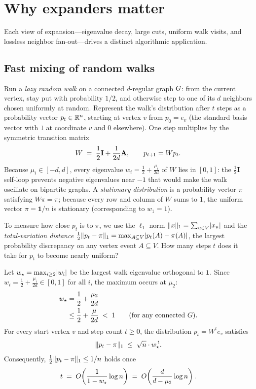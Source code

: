 \section{Why expanders matter}
\label{ch34:applications}

Each view of expansion---eigenvalue decay, large cuts, uniform walk visits, and lossless neighbor fan-out---drives a distinct algorithmic application.

\subsection{Fast mixing of random walks}
\label{ch34:mixing}

Run a \emph{lazy random walk} on a connected $d$-regular graph $G$: from the current vertex, stay put with probability $1/2$, and otherwise step to one of its $d$ neighbors chosen uniformly at random. Represent the walk's distribution after $t$ steps as a probability vector $p_t\in\mathbb{R}^n$, starting at vertex $v$ from $p_0=e_v$ (the standard basis vector with $1$ at coordinate $v$ and $0$ elsewhere). One step multiplies by the symmetric transition matrix
\[
  W \;=\; \frac{1}{2}\mathbf{I} + \frac{1}{2d}\mathbf{A}, \qquad p_{t+1} = Wp_t.
\]
Because $\mu_i\in[-d,d]$, every eigenvalue $w_i = \frac{1}{2}+\frac{\mu_i}{2d}$ of $W$ lies in $[0,1]$: the $\frac{1}{2}\mathbf{I}$ self-loop prevents negative eigenvalues near $-1$ that would make the walk oscillate on bipartite graphs. A \emph{stationary distribution} is a probability vector $\pi$ satisfying $W\pi=\pi$; because every row and column of $W$ sums to $1$, the uniform vector $\pi=\mathbf{1}/n$ is stationary (corresponding to $w_1=1$).

To measure how close $p_t$ is to $\pi$, we use the $\ell_1$ norm $\lVert x\rVert_1=\sum_{u\in V}\lvert x_u\rvert$ and the \emph{total-variation distance} $\frac{1}{2}\lVert p_t-\pi\rVert_1 = \max_{A\subseteq V}\lvert p_t(A)-\pi(A)\rvert$, the largest probability discrepancy on any vertex event $A\subseteq V$. How many steps $t$ does it take for $p_t$ to become nearly uniform?

\begin{theorem}
\label{ch34:thm-mixing}
Let $w_\star=\max_{i\ge 2}\lvert w_i\rvert$ be the largest walk eigenvalue orthogonal to $\mathbf{1}$. Since $w_i=\frac{1}{2}+\frac{\mu_i}{2d}\in[0,1]$ for all $i$, the maximum occurs at $\mu_2$:
\begin{align*}
  w_\star &= \frac{1}{2}+\frac{\mu_2}{2d} \\
          &\le \frac{1}{2}+\frac{\mu}{2d} \;<\; 1 \qquad (\text{for any connected } G).
\end{align*}
For every start vertex $v$ and step count $t\ge 0$, the distribution $p_t = W^t e_v$ satisfies
\[
  \lVert p_t-\pi\rVert_1 \;\le\; \sqrt{n}\cdot w_\star^{\,t}.
\]
Consequently, $\frac{1}{2}\lVert p_t-\pi\rVert_1 \le 1/n$ holds once
\[
  t \;=\; O\!\left(\frac{1}{1-w_\star}\log n\right) \;=\; O\!\left(\frac{d}{d-\mu_2}\log n\right).
\]
\end{theorem}


